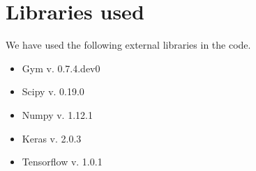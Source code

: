 \documentclass[11pt]{article}
\begin{document}
\section{Libraries used}\label{c:lib}
We have used the following external libraries in the code.
\begin{itemize}
\item Gym v. 0.7.4.dev0
\item Scipy v. 0.19.0
\item Numpy v. 1.12.1
\item Keras v. 2.0.3
\item Tensorflow v. 1.0.1
\end{itemize}
\end{document}
